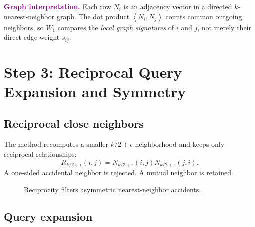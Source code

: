 \documentclass[11pt,oneside,openany]{book}
\theoremstyle{myplain}
\theoremstyle{definition}
\newcommand{\inner}[2]{\left\langle #1,#2\right\rangle}
\newcommand{\paperEq}[1]{\tag{P#1}}
\begin{document}
\medskip
\noindent\textbf{\textcolor{purple}{Graph interpretation.}}
Each row $N_i$ is an adjacency vector in a directed $k$-nearest-neighbor graph. The dot product $\inner{N_i}{N_j}$ counts common outgoing neighbors, so $W_1$ compares the \emph{local graph signatures} of $i$ and $j$, not merely their direct edge weight $s_{ij}$.


\chapter{Step 3: Reciprocal Query Expansion and Symmetry}
\label{chap:step3}

\section{Reciprocal close neighbors}

The method recomputes a smaller $k/2+\epsilon$ neighborhood and keeps only reciprocal relationships:
\begin{equation*}
R_{k/2+\epsilon}(i,j)
=N_{k/2+\epsilon}(i,j)N_{k/2+\epsilon}(j,i).
\paperEq{4a}
\label{eq:reciprocal}
\end{equation*}
A one-sided accidental neighbor is rejected. A mutual neighbor is retained.

\begin{figure}[H]
\centering
{}
\caption{Reciprocity filters asymmetric nearest-neighbor accidents.}
\label{fig:reciprocity}
\end{figure}

\section{Query expansion}
\end{document}
